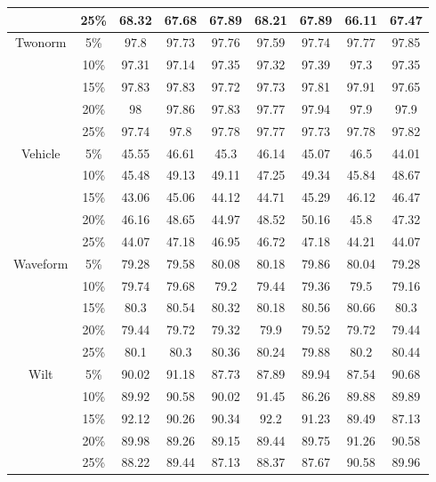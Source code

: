 \begin{longtable}[c]{|c|c|c|c|c|c|c|c|c|}
& 25\% & 68.32 & 67.68 & 67.89 & 68.21 & 67.89 & 66.11 & 67.47 \\ \hline
\multirow{5}{*}{Twonorm}
& 5\% & 97.8 & 97.73 & 97.76 & 97.59 & 97.74 & 97.77 & 97.85 \\ 
& 10\% & 97.31 & 97.14 & 97.35 & 97.32 & 97.39 & 97.3 & 97.35 \\
& 15\% & 97.83 & 97.83 & 97.72 & 97.73 & 97.81 & 97.91 & 97.65 \\
& 20\% & 98 & 97.86 & 97.83 & 97.77 & 97.94 & 97.9 & 97.9 \\
& 25\% & 97.74 & 97.8 & 97.78 & 97.77 & 97.73 & 97.78 & 97.82 \\ \hline
\multirow{5}{*}{Vehicle}
& 5\% & 45.55 & 46.61 & 45.3 & 46.14 & 45.07 & 46.5 & 44.01 \\ 
& 10\% & 45.48 & 49.13 & 49.11 & 47.25 & 49.34 & 45.84 & 48.67 \\
& 15\% & 43.06 & 45.06 & 44.12 & 44.71 & 45.29 & 46.12 & 46.47 \\
& 20\% & 46.16 & 48.65 & 44.97 & 48.52 & 50.16 & 45.8 & 47.32 \\
& 25\% & 44.07 & 47.18 & 46.95 & 46.72 & 47.18 & 44.21 & 44.07 \\ \hline
\multirow{5}{*}{Waveform}
& 5\% & 79.28 & 79.58 & 80.08 & 80.18 & 79.86 & 80.04 & 79.28 \\ 
& 10\% & 79.74 & 79.68 & 79.2 & 79.44 & 79.36 & 79.5 & 79.16 \\
& 15\% & 80.3 & 80.54 & 80.32 & 80.18 & 80.56 & 80.66 & 80.3 \\
& 20\% & 79.44 & 79.72 & 79.32 & 79.9 & 79.52 & 79.72 & 79.44 \\
& 25\% & 80.1 & 80.3 & 80.36 & 80.24 & 79.88 & 80.2 & 80.44 \\ \hline
\multirow{5}{*}{Wilt}
& 5\% & 90.02 & 91.18 & 87.73 & 87.89 & 89.94 & 87.54 & 90.68 \\ 
& 10\% & 89.92 & 90.58 & 90.02 & 91.45 & 86.26 & 89.88 & 89.89 \\
& 15\% & 92.12 & 90.26 & 90.34 & 92.2 & 91.23 & 89.49 & 87.13 \\
& 20\% & 89.98 & 89.26 & 89.15 & 89.44 & 89.75 & 91.26 & 90.58 \\
& 25\% & 88.22 & 89.44 & 87.13 & 88.37 & 87.67 & 90.58 & 89.96 \\ \hline
\end{longtable}

